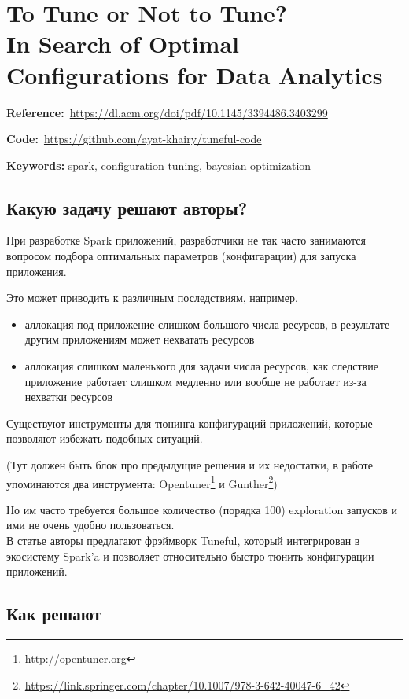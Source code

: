 \chapter{To Tune or Not to Tune? \\ In Search of Optimal Configurations for Data Analytics}

\textbf{Reference:}~\url{https://dl.acm.org/doi/pdf/10.1145/3394486.3403299}

\textbf{Code:}~\url{https://github.com/ayat-khairy/tuneful-code}

\textbf{Keywords:} spark, configuration tuning, bayesian optimization

\section*{Какую задачу решают авторы?}

При разработке Spark приложений, разработчики не так часто занимаются вопросом подбора оптимальных параметров (конфигарации) для запуска приложения.

Это может приводить к различным последствиям, например, 
\begin{itemize}
    \item аллокация под приложение слишком большого числа ресурсов, в результате другим приложениям может нехватать ресурсов
    \item аллокация слишком маленького для задачи числа ресурсов, как следствие приложение работает слишком медленно или вообще не работает из-за нехватки ресурсов
\end{itemize}

Существуют инструменты для тюнинга конфигураций приложений, которые позволяют избежать подобных ситуаций.

(Тут должен быть блок про предыдущие решения и их недостатки, в работе упоминаются два инструмента: Opentuner\footnote{\url{http://opentuner.org}} и Gunther\footnote{\url{https://link.springer.com/chapter/10.1007/978-3-642-40047-6_42}})

Но им часто требуется большое количество (порядка 100) exploration запусков и ими не очень удобно пользоваться. \\

В статье авторы предлагают фрэймворк Tuneful, который интегрирован в экосистему Spark'a и позволяет относительно быстро тюнить конфигурации приложений.

\section*{Как решают}

